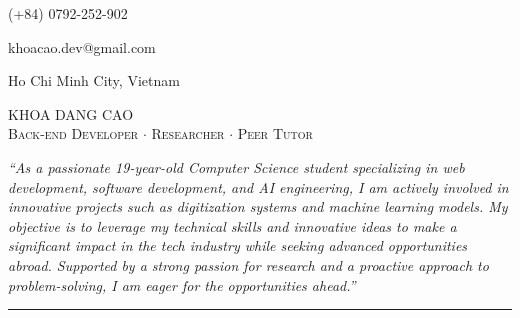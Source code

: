 \documentclass[a4paper, 10pt]{article}
\begin{document}
\begin{flushright}
  \item {\Calluna (+84) 0792-252-902}  %
  \item {\Calluna khoacao.dev@gmail.com}  %
  \item {\Calluna Ho Chi Minh City, Vietnam}  %
\end{flushright}\vspace{-60pt}

\begin{flushleft}
  {\Calluna \fontsize{30pt}{0pt}\selectfont \textsc{KHOA DANG CAO}} \\
  \vspace{5pt}
  {\Calluna \fontsize{10pt}{30pt}\selectfont \textsc{Back-end Developer} \hspace{5pt} $\cdot$ \hspace{5pt} \textsc{Researcher} \hspace{5pt} $\cdot$ \hspace{5pt} \textsc{Peer Tutor}}

  \noindent
    \begin{justify}
    \textit{``As a passionate 19-year-old Computer Science student specializing in web development, software development, and AI engineering, I am actively involved in innovative projects such as digitization systems and machine learning models. My objective is to leverage my technical skills and innovative ideas to make a significant impact in the tech industry while seeking advanced opportunities abroad. Supported by a strong passion for research and a proactive approach to problem-solving, I am eager for the opportunities ahead.''}
    \end{justify}
    \noindent\rule{\textwidth}{0.3pt}
\end{flushleft}

\end{document}
